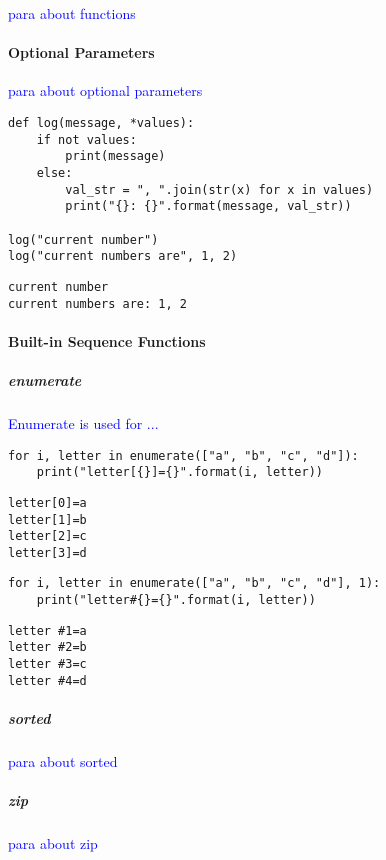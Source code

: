 \textcolor{blue}{para about functions}

\paragraph{Optional Parameters}

\textcolor{blue}{para about optional parameters}

\begin{lstlisting}[style=pyInStyle]
def log(message, *values):
    if not values:
        print(message)
    else:
        val_str = ", ".join(str(x) for x in values)
        print("{}: {}".format(message, val_str))

log("current number")
log("current numbers are", 1, 2)
\end{lstlisting}
\begin{lstlisting}[style=pyOutStyle]
current number
current numbers are: 1, 2
\end{lstlisting}

\paragraph{Built-in Sequence Functions}

\subparagraph{enumerate}

\textcolor{blue}{Enumerate is used for ...}

\begin{lstlisting}[style=pyInStyle]
for i, letter in enumerate(["a", "b", "c", "d"]):
    print("letter[{}]={}".format(i, letter))
\end{lstlisting}
\begin{lstlisting}[style=pyOutStyle]
letter[0]=a
letter[1]=b
letter[2]=c
letter[3]=d
\end{lstlisting}


\begin{lstlisting}[style=pyInStyle]
for i, letter in enumerate(["a", "b", "c", "d"], 1):
    print("letter#{}={}".format(i, letter))
\end{lstlisting}
\begin{lstlisting}[style=pyOutStyle]
letter #1=a
letter #2=b
letter #3=c
letter #4=d
\end{lstlisting}


\subparagraph{sorted}

\textcolor{blue}{para about sorted}

\subparagraph{zip}

\textcolor{blue}{para about zip}

